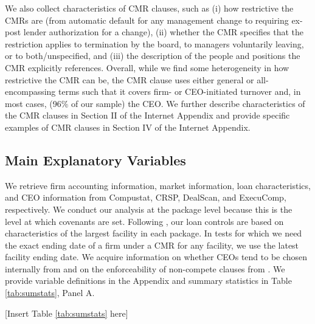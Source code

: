 \documentclass[a4paper,12pt]{article}
\begin{document}
We also collect characteristics of CMR clauses, such as (i) how restrictive the CMRs are (from automatic default for any management change to requiring ex-post lender authorization for a change), (ii) whether the CMR specifies that the restriction applies to termination by the board, to managers voluntarily leaving, or to both/unspecified, and (iii) the description of the people and positions the CMR explicitly references.
Overall, while we find some heterogeneity in how restrictive the CMR can be, the CMR clause uses either general or all-encompassing terms such that it covers firm- or CEO-initiated turnover and, in most cases, (96\% of our sample) the CEO.
We further describe characteristics of the CMR clauses in Section II of the Internet Appendix and provide specific examples of CMR clauses in Section IV of the Internet Appendix.



\subsection{Main Explanatory Variables}

We retrieve firm accounting information, market information, loan characteristics, and CEO information from Compustat, CRSP, DealScan, and ExecuComp, respectively.
We conduct our analysis at the package level because this is the level at which covenants are set.
Following \citet{Ivashina_2009}, our loan controls are based on characteristics of the largest facility in each package.
In tests for which we need the exact ending date of a firm under a CMR for any facility, we use the latest facility ending date.
We acquire information on whether CEOs tend to be chosen internally from \citet{Cremers_2014} and  on the enforceability of non-compete clauses from \citet{Garmaise_2011}.
We provide variable definitions in the Appendix and summary statistics in Table \ref{tab:sumstats}, Panel A.

\begin{center}
	[Insert Table \ref{tab:sumstats} here]
\end{center}



\end{document}
